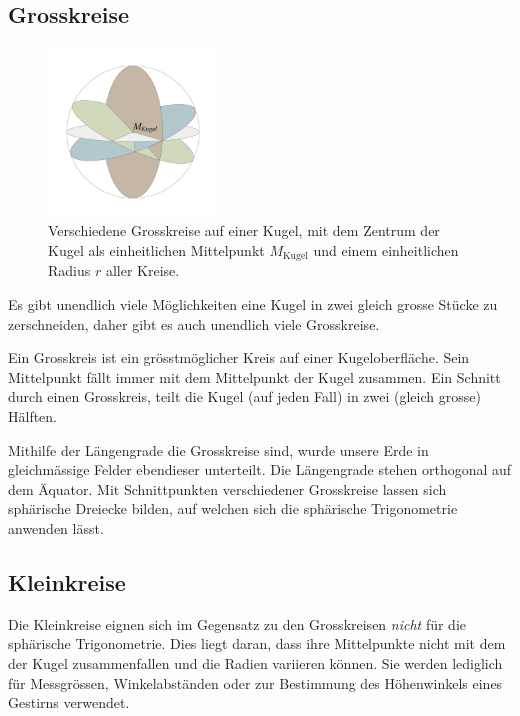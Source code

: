 \begin{refsection}
\subsection{Grosskreise}
\begin{figure}
\centering
\includegraphics[width=0.4\textwidth]{kugel/Grosskreise.jpg}
\caption{Verschiedene Grosskreise auf einer Kugel, mit dem Zentrum
der Kugel als einheitlichen Mittelpunkt $M_{\text{Kugel}}$ und einem
einheitlichen Radius $r$ aller Kreise.}
\end{figure}

Es gibt unendlich viele Möglichkeiten eine Kugel in zwei gleich
grosse Stücke zu zerschneiden, daher gibt es auch unendlich viele
Grosskreise.

\begin{definition}
Ein Grosskreis ist ein grösstmöglicher Kreis auf einer Kugeloberfläche.
Sein Mittelpunkt fällt immer mit dem Mittelpunkt der Kugel zusammen.
Ein Schnitt durch einen Grosskreis, teilt die Kugel (auf jeden Fall)
in zwei (gleich grosse) Hälften.
\label{skript:kugel:satz:Grosskreis}
%
\end{definition}

Mithilfe der Längengrade die Grosskreise sind, wurde unsere Erde
in gleichmässige Felder ebendieser unterteilt. Die Längengrade
stehen orthogonal auf dem Äquator. Mit Schnittpunkten verschiedener
Grosskreise lassen sich sphärische Dreiecke bilden, auf welchen
sich die sphärische Trigonometrie anwenden lässt.


\subsection{Kleinkreise}
Die Kleinkreise eignen sich im Gegensatz zu den Grosskreisen {\em
nicht} für die sphärische Trigonometrie.  Dies liegt daran, dass
ihre Mittelpunkte nicht mit dem der Kugel zusammenfallen und die
Radien variieren können.
Sie werden lediglich für Messgrössen, Winkelabständen oder zur
Bestimmung des Höhenwinkels eines Gestirns verwendet.


\end{refsection}
